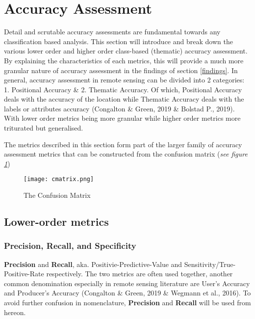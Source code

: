 \documentclass[11pt, a4paper, twoside]{report}
\begin{document}
\section{Accuracy Assessment}\label{AccAss}


Detail and scrutable accuracy assessments are fundamental towards any classification based analysis. This section will introduce and break down the various lower order and higher order class-based (thematic) accuracy assessment. By explaining the characteristics of each metrics, this will provide a much more granular nature of accuracy assessment in the findings of section \ref{findings}. In general, accuracy assessment in remote sensing can be divided into 2 categories: 1. Positional Accuracy \& 2. Thematic Accuracy. Of which, Positional Accuracy deals with the accuracy of the location while Thematic Accuracy deals with the labels or attributes accuracy (Congalton \& Green, 2019 \& Bolstad P., 2019). With lower order metrics being more granular while higher order metrics more triturated but generalised.\\\par

The metrics described in this section form part of the larger family of accuracy assessment metrics that can be constructed from the confusion matrix (\textit{see figure \ref{fig:cmatrix}})\\\par

\begin{figure}[H]
  \centering
  \texttt{[image: cmatrix.png]}
  \caption{The Confusion Matrix}
  \label{fig:cmatrix}
\end{figure}

\subsection{Lower-order metrics}\label{1storder}
\subsubsection{Precision, Recall, and Specificity}\label{PR&S}

\textbf{Precision} and \textbf{Recall}, aka. Positivie-Predictive-Value and Sensitivity/True-Positive-Rate respectively. The two metrics are often used together, another common denomination especially in remote sensing literature are User's Accuracy and Producer's Accuracy (Congalton \& Green, 2019 \& Wegmann et al., 2016). To avoid further confusion in nomenclature, \textbf{Precision} and \textbf{Recall} will be used from hereon.\\\par
\end{document}
